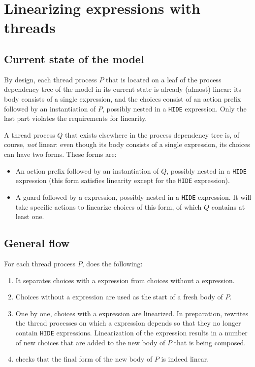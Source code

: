 \section{Linearizing expressions with threads}

\subsection{Current state of the model}

By design, each thread process $P$ that is located on a leaf of the process dependency tree of the model in its current state is already (almost) linear: its body consists of a single \choice{} expression, and the choices consist of an action prefix followed by an instantiation of $P$, possibly nested in a \texttt{HIDE} expression.
Only the last part violates the requirements for linearity.

A thread process $Q$ that exists elsewhere in the process dependency tree is, of course, \emph{not} linear: even though its body consists of a single \choice{} expression, its choices can have two forms.
These forms are:
\begin{itemize}
\item An action prefix followed by an instantiation of $Q$, possibly nested in a \texttt{HIDE} expression (this form satisfies linearity except for the \texttt{HIDE} expression).
\item A guard followed by a \pedi{} expression, possibly nested in a \texttt{HIDE} expression.
It will take specific actions to linearize choices of this form, of which $Q$ contains at least one.
\end{itemize}

\subsection{General flow}

For each thread process $P$, \lpeq{} does the following:
\begin{enumerate}[1.]
\item It separates choices with a \pedi{} expression from choices without a \pedi{} expression.
\item Choices without a \pedi{} expression are used as the start of a fresh body of $P$.
\item One by one, choices with a \pedi{} expression are linearized.
In preparation, \lpeq{} rewrites the thread processes on which a \pedi{} expression depends so that they no longer contain \texttt{HIDE} expressions.
Linearization of the \pedi{} expression results in a number of new choices that are added to the new body of $P$ that is being composed.
\item \lpeq{} checks that the final form of the new body of $P$ is indeed linear.
\end{enumerate}

